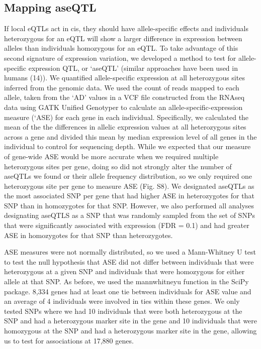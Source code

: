 \subsection{Mapping aseQTL}
If local eQTLs act in cis, they should have allele-specific effects and individuals heterozygous for an eQTL will show a larger difference in expression between alleles than individuals homozygous for an eQTL. To take advantage of this second signature of expression variation, we developed a method to test for allele-specific expression QTL, or ‘aseQTL’ (similar approaches have been used in humans (14)). We quantified allele-specific expression at all heterozygous sites inferred from the genomic data. We used the count of reads mapped to each allele, taken from the ‘AD’ values in a VCF file constructed from the RNAseq data using GATK Unified Genotyper to calculate an allele-specific-expression measure (‘ASE) for each gene in each individual. Specifically, we calculated the mean of the the differences in allelic expression values at all heterozygous sites across a gene and divided this mean by median expression level of all genes in the individual to control for sequencing depth. While we expected that our measure of gene-wide ASE would be more accurate when we required multiple heterozygous sites per gene, doing so did not strongly alter the number of aseQTLs we found or their allele frequency distribution, so we only required one heterozygous site per gene to measure ASE (Fig. S8). We designated aseQTLs as the most associated SNP per gene that had higher ASE in heterozygotes for that SNP than in homozygotes for that SNP. However, we also performed all analyses designating aseQTLS as a SNP that was randomly sampled from the set of SNPs that were significantly associated with expression (FDR = 0.1) and had greater ASE in homozygotes for that SNP than heterozygotes.

ASE measures were not normally distributed, so we used a Mann-Whitney U test to test the null hypothesis that ASE did not differ between individuals that were heterozygous at a given SNP and individuals that were homozygous for either allele at that SNP. As before, we used the mannwhitneyu function in the SciPy package. 8,334 genes had at least one tie between individuals for ASE value and an average of 4 individuals were involved in ties within these genes. We only tested SNPs where we had 10 individuals that were both heterozygous at the SNP and had a heterozygous marker site in the gene and 10 individuals that were homozygous at the SNP and had a heterozygous marker site in the gene, allowing us to test for associations at 17,880 genes. 

